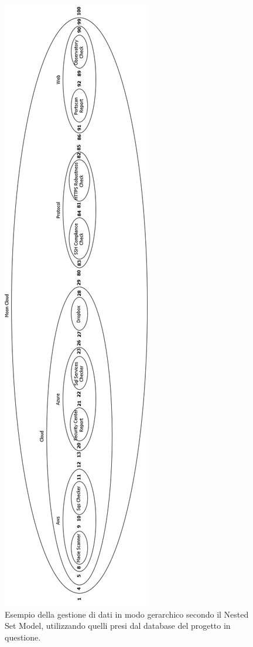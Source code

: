 \begin{figure}
    \centering
    \includegraphics[scale=0.58]{images/MC_Rec_NSM_Container.jpg}
    \caption[Gestione di dati (visione completa) secondo il NSM]{Esempio della gestione di dati in modo gerarchico secondo il Nested Set Model, utilizzando quelli presi dal database del 
    progetto in questione.}
    \label{fig:MC_Rec_NSM_Container}
\end{figure}
%
\newpage
%
